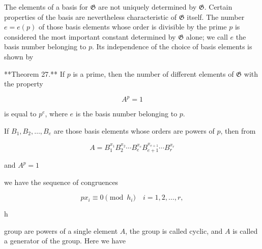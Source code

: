 The elements of a basis for $\mathfrak{G}$ are not uniquely determined by $\mathfrak{G}$. Certain properties of the basis are nevertheless characteristic of $\mathfrak{G}$ itself. The number $e = e(p)$ of those basis elements whose order is divisible by the prime $p$ is considered the most important constant determined by $\mathfrak{G}$ alone; we call $e$ the basis number belonging to $p$. Its independence of the choice of basis elements is shown by

**Theorem 27.** If $p$ is a prime, then the number of different elements of $\mathfrak{G}$ with the property

$$A^p = 1$$

is equal to $p^e$, where $e$ is the basis number belonging to $p$.

If $B_1, B_2, \ldots, B_e$ are those basis elements whose orders are powers of $p$, then from

$$A = B_1^{x_1} B_2^{x_2} \cdots B_e^{x_e} B_{e+1}^{x_{e+1}} \cdots B_r^{x_r}$$

and $A^p = 1$

we have the sequence of congruences

$$px_i \equiv 0 \pmod{h_i} \quad i = 1, 2, \ldots, r,$$

h

group are powers of a single element $A$, the group is called cyclic, and $A$ is called a generator of the group. Here we have
